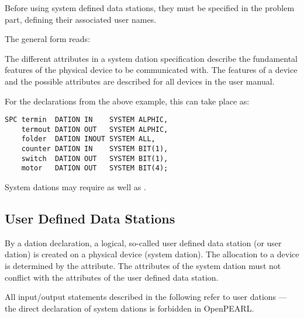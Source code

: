 Before using system defined data stations, they must be specified in the
problem part, defining their associated user names. 

The general form reads:

\begin{grammarframe}


\end{grammarframe}

The different attributes in a system dation specification describe the
fundamental features of the physical device to be communicated with. The
features of a device and the possible attributes are described for all
devices in the user manual.

For the declarations from the above example, this can take place as:

\begin{lstlisting}
SPC termin  DATION IN    SYSTEM ALPHIC,
    termout DATION OUT   SYSTEM ALPHIC,
    folder  DATION INOUT SYSTEM ALL,   
    counter DATION IN    SYSTEM BIT(1),
    switch  DATION OUT   SYSTEM BIT(1),
    motor   DATION OUT   SYSTEM BIT(4);
\end{lstlisting}

System dations may require   as well as .

\subsection{User Defined Data Stations}    %

By a dation declaration, a logical, so-called user defined data station
(or user dation) is created on a physical device (system dation). The
allocation to a device is determined by the 
  attribute.
The attributes of the system dation must not conflict with the attributes
of the user defined data station.

All input/output statements described in the following refer to user
dations --- the direct declaration of system dations is forbidden in OpenPEARL.


\begin{grammarframe}

\end{grammarframe}

